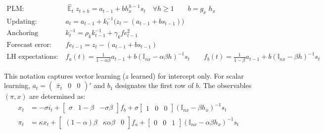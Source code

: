 \documentclass[11pt]{article}
\renewcommand{\[}{\begin{equation}}
\renewcommand{\]}{\end{equation}}
\DeclareMathOperator{\E}{\mathbb{E}}
\begin{document}
\vspace{-1.2cm}

\begin{align}
\text{PLM:} \quad \quad & \hat{\E}_t z_{t+h}  =  a_{t-1} + bh_x^{h-1}s_t  \quad \forall h\geq 1 \quad \quad b = g_x\; h_x \quad \quad  \label{PLM} \\
\text{Updating:} \quad \quad & a_{t}  =a_{t-1} +k_t^{-1}\big(z_{t} -(a_{t-1}+b s_{t-1}) \big)  \label{A5} \\
\text{Anchoring function:} \quad \quad & k^{-1}_t  = \rho_k k^{-1}_{t-1} + \gamma_k fe_{t-1}^2 \label{A6}\\
\text{Forecast error:} \quad \quad & fe_{t-1}  = z_t - (a_{t-1}+b s_{t-1}) \label{A7} \\
\text{LH expectations:} \quad \quad & f_a(t) = \frac{1}{1-\alpha\beta}a_{t-1}  + b(\mathbb{I}_{nx} - \alpha\beta h)^{-1}s_t \quad \quad  f_b(t) = \frac{1}{1-\beta}a_{t-1}  + b(\mathbb{I}_{nx} - \beta h)^{-1}s_t  \label{A8}
\end{align}

\vspace{-0.5cm}

This notation captures vector learning ($z$ learned) for intercept only. For scalar learning, $a_t= \begin{pmatrix} \bar{\pi}_t & 0 & 0\end{pmatrix}' $ and $b_1$ designates the first row of $b$. The observables $(\pi, x)$ are determined as:
\begin{align}
x_t &=  -\sigma i_t + \begin{bmatrix} \sigma & 1-\beta & -\sigma\beta \end{bmatrix} f_b + \sigma \begin{bmatrix} 1 & 0 & 0 \end{bmatrix} (\mathbb{I}_{nx} - \beta h_x)^{-1} s_t \label{A9} \\
\pi_t &= \kappa x_t  + \begin{bmatrix} (1-\alpha)\beta & \kappa\alpha\beta & 0 \end{bmatrix}  f_a + \begin{bmatrix} 0 & 0 & 1 \end{bmatrix}  (\mathbb{I}_{nx} - \alpha \beta h_x)^{-1}  s_t \label{A10}
\end{align}
\end{document}
